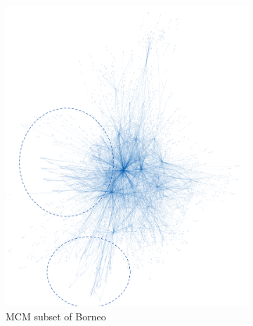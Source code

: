 \begin{figure}[H]
\begin{subfigure}[b]{0.495\textwidth}
          \includegraphics[width=\textwidth]{figures_c1/graph_compare/borneo.png}
          \caption{MCM subset of Borneo}
          \label{fig:borneo}
      \end{subfigure}
      \hfill
       \begin{subfigure}[b]{0.495\textwidth}
          \centering

\end{subfigure}
\end{figure}
